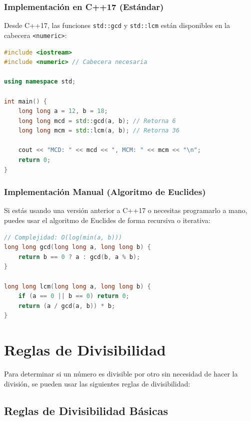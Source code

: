\subsubsection*{Implementación en C++17 (Estándar)}
Desde C++17, las funciones \texttt{std::gcd} y \texttt{std::lcm} están disponibles en la cabecera \texttt{<numeric>}:
\begin{lstlisting}[language=C++, caption={MCD y MCM con la librería estándar de C++17}]
#include <iostream>
#include <numeric> // Cabecera necesaria

using namespace std;

int main() {
    long long a = 12, b = 18;
    long long mcd = std::gcd(a, b); // Retorna 6
    long long mcm = std::lcm(a, b); // Retorna 36
    
    cout << "MCD: " << mcd << ", MCM: " << mcm << "\n";
    return 0;
}
\end{lstlisting}

\subsubsection*{Implementación Manual (Algoritmo de Euclides)}
Si estás usando una versión anterior a C++17 o necesitas programarlo a mano, puedes usar el algoritmo de Euclides de forma recursiva o iterativa:
\begin{lstlisting}[language=C++, caption={Implementación manual de MCD y MCM}]
// Complejidad: O(log(min(a, b)))
long long gcd(long long a, long long b) {
    return b == 0 ? a : gcd(b, a % b);
}

long long lcm(long long a, long long b) {
    if (a == 0 || b == 0) return 0;
    return (a / gcd(a, b)) * b;
}
\end{lstlisting}

\section{Reglas de Divisibilidad}

Para determinar si un número es divisible por otro sin necesidad de hacer la división, se pueden usar las siguientes reglas de divisibilidad:

\subsection{Reglas de Divisibilidad Básicas}

